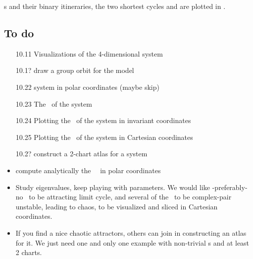 \documentclass[aip,cha,
reprint,
secnumarabic,
nofootinbib, tightenlines,
nobibnotes, showkeys, showpacs,
groupedaddress,
]{revtex4-1}
\begin{document}
\rpo s and their binary itineraries, the two shortest cycles
 and  are plotted in
.




\subsection{To do}
\label{s:ToDo}

\begin{itemize}
  \item[10.11] Visualizations of the 4-dimensional {\twoMode} system
  \item[10.1?] draw a group orbit for the {\twoMode} model
  \item[10.22] {\twoMode} system in polar coordinates (maybe skip)
  \item[10.23] The \reqva\ of the {\twoMode} system
  \item[10.24] Plotting the \reqva\ of
           the {\twoMode} system in invariant coordinates
  \item[10.25] Plotting the \reqva\ of
           the {\twoMode} system in Cartesian coordinates
  \item[10.2?] construct a 2-chart atlas
            for a {\twoMode} system
  \item
        compute analytically the \stabmat\ \Mvar\ in polar coordinates
  \item
        Study eigenvalues, keep playing with parameters. We would like
        -preferably- no \reqv\ to be attracting limit cycle, and several of
        the \reqva\ to be complex-pair unstable, leading to chaos, to be
        visualized and sliced in Cartesian coordinates.
  \item
        If you find a nice chaotic attractors, others can join in
        constructing an atlas for it. We just need one and only one
        example with non-trivial \chartBord s and at least 2 charts.
\end{itemize}
\end{document}
